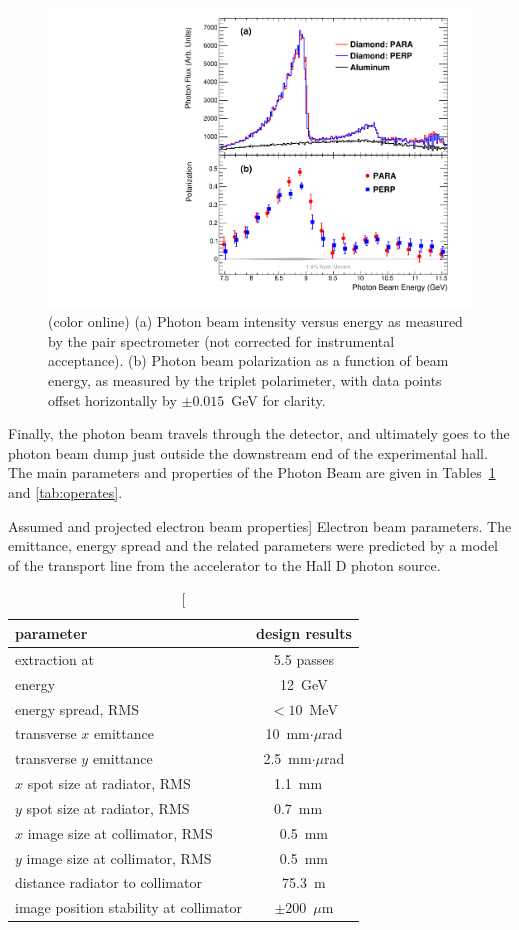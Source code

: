  \begin{figure}[t]
\begin{center}
 \includegraphics[clip=true,width=0.5\linewidth]{figures/gx3102_pi0etaAsym2016_fig0_beam.pdf}
\end{center}
\caption{(color online) (a) Photon beam intensity versus energy as measured by the pair spectrometer (not corrected for instrumental acceptance).  (b) Photon beam polarization as a function of beam energy, as measured by the triplet polarimeter, with data points offset horizontally by $\pm0.015$~GeV for clarity.
        }
\label{fig:beam:gx3102_pi0etaAsym2016_fig0_beam} 
\end{figure}



Finally, the photon beam travels through the \GX{} detector, and
ultimately goes to the photon beam dump just outside the downstream
end of the experimental hall.
The main parameters and properties of the Photon Beam are given in
Tables~\ref{tab:elecprop} and \ref{tab:operates}.




\begin{table}[tbp]
\begin{center}
\caption
[Assumed and projected electron beam properties]
{Electron beam parameters. The emittance, energy spread and
the related parameters were
predicted by a model of the transport line from
the accelerator to the Hall D photon source. }
\label{tab:elecprop}
\begin{tabular}{|l|c|}
\hline\hline
parameter & design results \\
\hline
extraction at & 5.5 passes \\
energy & 12~GeV \\
energy spread, RMS & $<10$~MeV \\
transverse $x$ emittance & 10~mm$\cdot\mu$rad \\
transverse $y$ emittance & 2.5~mm$\cdot\mu$rad \\
$x$ spot size at radiator, RMS & 1.1~mm \ \\
$y$ spot size at radiator, RMS & 0.7~mm \ \\
$x$ image size at collimator, RMS & 0.5~mm \\
$y$ image size at collimator, RMS & 0.5~mm \\
distance radiator to collimator & 75.3~m \\
image position stability at collimator & $\pm$200~$\mu$m \\
\hline\hline
\end{tabular}
\end{center}
\end{table}



